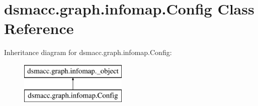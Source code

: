 \hypertarget{classdsmacc_1_1graph_1_1infomap_1_1Config}{}\section{dsmacc.\+graph.\+infomap.\+Config Class Reference}
\label{classdsmacc_1_1graph_1_1infomap_1_1Config}
Inheritance diagram for dsmacc.\+graph.\+infomap.\+Config\+:\begin{figure}[H]
\begin{center}
\leavevmode
\includegraphics[height=2.000000cm]{classdsmacc_1_1graph_1_1infomap_1_1Config}
\end{center}
\end{figure}

